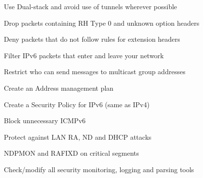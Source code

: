 Use Dual-stack and avoid use of tunnels wherever possible

Drop packets containing RH Type 0 and unknown option headers

Deny packets that do not follow rules for extension headers

Filter IPv6 packets that enter and leave your network

Restrict who can send messages to multicast group addresses

Create an Address management plan

Create a Security Policy for IPv6 (same as IPv4)

Block unnecessary ICMPv6

Protect against LAN RA, ND and DHCP attacks

NDPMON and RAFIXD on critical segments

Check/modify all security monitoring, logging and parsing tools




